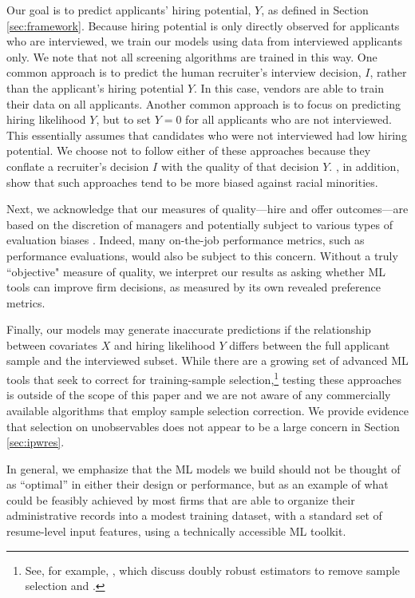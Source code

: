 \documentclass[crop,noquery,editorname,historyrev,nosurname,runningno,sepcount]{RESTUD}
\begin{document}
Our goal is to predict applicants' hiring potential, $Y$, as defined in Section \ref{sec:framework}. Because hiring potential is only directly observed for applicants who are interviewed, we train our models using data from interviewed applicants only. We note that not all screening algorithms are trained in this way.  One common approach is to predict the human recruiter's interview decision, $I$, rather than the applicant's hiring potential $Y$.  In this case, vendors are able to train their data on all applicants.  Another common approach is to focus on predicting hiring likelihood $Y$, but to set $Y=0$ for all applicants who are not interviewed.  This essentially assumes that candidates who were not interviewed had low hiring potential.  We choose not to follow either of these approaches because they conflate a recruiter's decision $I$ with the quality of that decision $Y$. \citet{rambachan2019bias}, in addition, show that such approaches tend to be more biased against racial minorities.  

Next, we acknowledge that our measures of quality---hire and offer outcomes---are based on the discretion of managers and potentially subject to various types of evaluation biases \citep{Quadlin2018, castilla2011}.  Indeed, many on-the-job performance metrics, such as performance evaluations, would also be subject to this concern.  Without a truly ``objective" measure of quality, we interpret our results as asking whether ML tools can improve firm decisions, as measured by its own revealed preference metrics. 

Finally, our models may generate inaccurate predictions if the relationship between covariates $X$ and hiring likelihood $Y$ differs between the full applicant sample and the interviewed subset.  While there are a growing set of advanced ML tools that seek to correct for training-sample selection,\footnote{See, for example, \citet{dimakopoulou_balanced_2018}, \citet{dimakopoulou_estimation_2018} which discuss doubly robust estimators to remove sample selection and \citet{si2020distributional}.} testing these approaches is outside of the scope of this paper and we are not aware of any commercially available algorithms that employ sample selection correction.  We provide evidence that selection on unobservables does not appear to be a large concern in Section \ref{sec:ipwres}.

In general, we emphasize that the ML models we build should not be thought of as ``optimal'' in either their design or performance, but as an example of what could be feasibly achieved by most firms that are able to organize their administrative records into a modest training dataset, with a standard set of resume-level input features, using a technically accessible ML toolkit.
\end{document}
